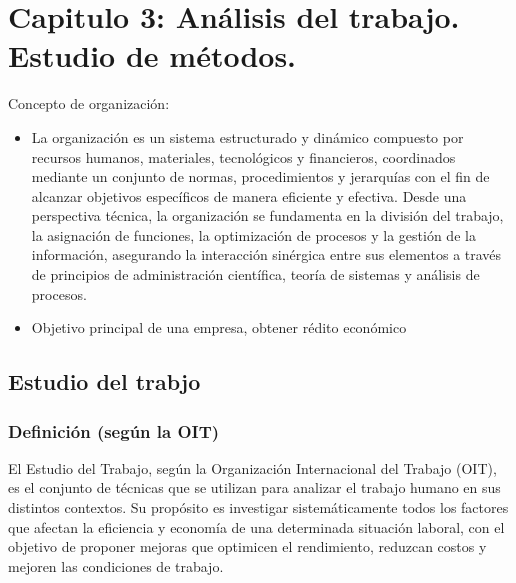 \documentclass[a4paper,oneside,11pt]{article}
\begin{document}
\newpage


\section{Capitulo 3: Análisis del trabajo. Estudio de métodos.}


Concepto de organización: 

\begin{itemize}
    \item La organización es un sistema estructurado y dinámico compuesto por recursos humanos, materiales, tecnológicos y financieros, coordinados mediante un conjunto de normas, procedimientos y jerarquías con el fin de alcanzar objetivos específicos de manera eficiente y efectiva. Desde una perspectiva técnica, la organización se fundamenta en la división del trabajo, la asignación de funciones, la optimización de procesos y la gestión de la información, asegurando la interacción sinérgica entre sus elementos a través de principios de administración científica, teoría de sistemas y análisis de procesos.

    \item Objetivo principal de una empresa, obtener rédito económico
\end{itemize}



\subsection{Estudio del trabjo}

\subsubsection{Definición (según la OIT)}

El Estudio del Trabajo, según la Organización Internacional del Trabajo (OIT), es el conjunto de técnicas que se utilizan para analizar el trabajo humano en sus distintos contextos. Su propósito es investigar sistemáticamente todos los factores que afectan la eficiencia y economía de una determinada situación laboral, con el objetivo de proponer mejoras que optimicen el rendimiento, reduzcan costos y mejoren las condiciones de trabajo.
\end{document}
